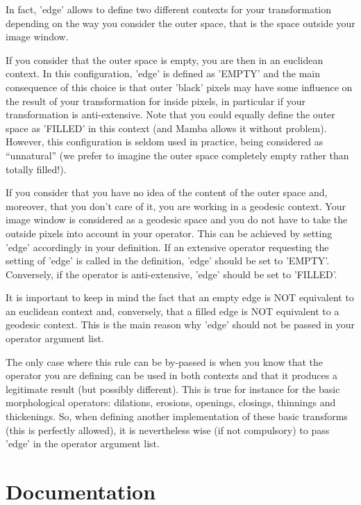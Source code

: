 \documentclass[a4paper,10pt,oneside]{article}
\begin{document}
In fact, 'edge' allows to define two different contexts for your transformation 
depending on the way you consider the outer space, that is the space outside 
your image window.

If you consider that the outer space is empty, you are then in an euclidean 
context. In this configuration, 'edge' is defined as 'EMPTY' and the main 
consequence of this choice is that outer 'black' pixels may have some influence 
on the result of your transformation for inside pixels, in particular if your 
transformation is anti-extensive. Note that you could equally define the outer 
space as 'FILLED' in this context (and Mamba allows it without problem). 
However, this configuration is seldom used in practice, being considered as 
``unnatural'' (we prefer to imagine the outer space completely empty rather 
than totally filled!).

If you consider that you have no idea of the content of the outer space and, 
moreover, that you don't care of it, you are working in a geodesic context. 
Your image window is considered as a geodesic space and you do not have to take 
the outside pixels into account in your operator. This can be achieved by 
setting 'edge' accordingly in your definition. If  an extensive operator 
requesting the setting of 'edge' is called in the definition, 'edge' should be 
set to 'EMPTY'. Conversely, if the operator is anti-extensive, 'edge' should be 
set to 'FILLED'.

It is important to keep in mind the fact that an empty edge is NOT equivalent 
to an euclidean context and, conversely, that a filled edge is NOT equivalent 
to a geodesic context. This is the main reason why 'edge' should not be passed 
in your operator argument list.

The only case where this rule can be by-passed is when you know that the 
operator you are defining can be used in both contexts and that it produces a 
legitimate result (but possibly different). This is true for instance for the 
basic morphological operators: dilations, erosions, openings, closings, 
thinnings and thickenings. So, when defining another implementation of these 
basic transforms (this is perfectly allowed), it is nevertheless wise (if not 
compulsory) to pass 'edge' in the operator argument list.

\section{Documentation}
\end{document}
